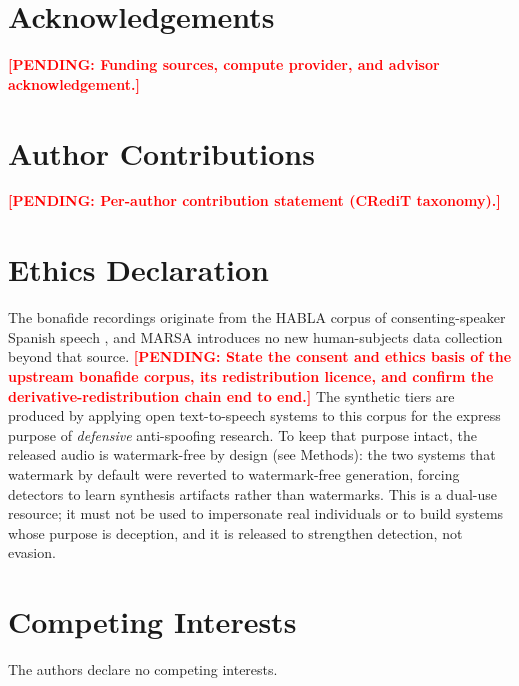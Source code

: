 \documentclass[11pt]{article}
\newcommand{\PENDING}[1]{\textcolor{red}{\textbf{[PENDING: #1]}}}
\begin{document}
\section*{Acknowledgements}
\PENDING{Funding sources, compute provider, and advisor acknowledgement.}

\section*{Author Contributions}
\PENDING{Per-author contribution statement (CRediT taxonomy).}

\section*{Ethics Declaration}
The bonafide recordings originate from the HABLA corpus of
consenting-speaker Spanish speech \citep{habla}, and MARSA introduces no
new human-subjects data collection beyond that source. \PENDING{State the
consent and ethics basis of the upstream bonafide corpus, its
redistribution licence, and confirm the derivative-redistribution chain
end to end.} The synthetic tiers are produced by applying open
text-to-speech systems to this corpus for the express purpose of
\emph{defensive} anti-spoofing research. To keep that purpose intact,
the released audio is watermark-free by design (see Methods): the two
systems that watermark by default were reverted to watermark-free
generation, forcing detectors to learn synthesis artifacts rather than
watermarks. This is a dual-use resource; it must not be used to
impersonate real individuals or to build systems whose purpose is
deception, and it is released to strengthen detection, not evasion.

\section*{Competing Interests}
The authors declare no competing interests.
\end{document}
